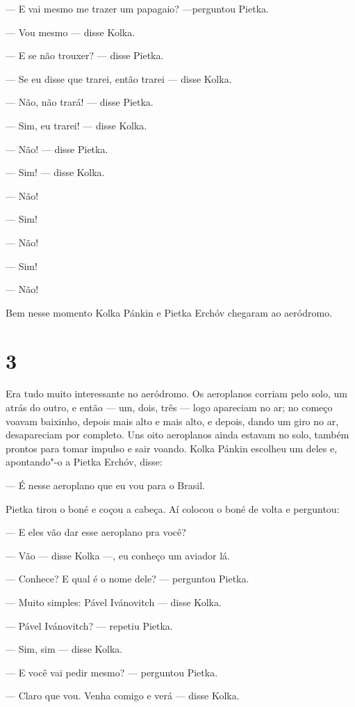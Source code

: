 --- E vai mesmo me trazer um papagaio? ---perguntou Pietka.

--- Vou mesmo --- disse Kolka.

--- E se não trouxer? --- disse Pietka.

--- Se eu disse que trarei, então trarei --- disse Kolka.

--- Não, não trará! --- disse Pietka.

--- Sim, eu trarei! --- disse Kolka.

--- Não! --- disse Pietka.

--- Sim! --- disse Kolka.

--- Não!

--- Sim!

--- Não!

--- Sim!

--- Não!

Bem nesse momento Kolka Pánkin e Pietka Erchóv chegaram ao aeródromo.

\section{3}

Era tudo muito interessante no aeródromo. Os aeroplanos corriam pelo
solo, um atrás do outro, e então --- um, dois, três --- logo apareciam
no ar; no começo voavam baixinho, depois mais alto e mais alto, e
depois, dando um giro no ar, desapareciam por completo. Uns oito
aeroplanos ainda estavam no solo, também prontos para tomar impulso e
sair voando. Kolka Pánkin escolheu um deles e, apontando"-o a Pietka
Erchóv, disse:

--- É nesse aeroplano que eu vou para o Brasil.

Pietka tirou o boné e coçou a cabeça. Aí colocou o boné de volta e
perguntou:

--- E eles vão dar esse aeroplano pra você?

--- Vão --- disse Kolka ---, eu conheço um aviador lá.

--- Conhece? E qual é o nome dele? --- perguntou Pietka.

--- Muito simples: Pável Ivánovitch --- disse Kolka.

--- Pável Ivánovitch? --- repetiu Pietka.

--- Sim, sim --- disse Kolka.

--- E você vai pedir mesmo? --- perguntou Pietka.

--- Claro que vou. Venha comigo e verá --- disse Kolka.

